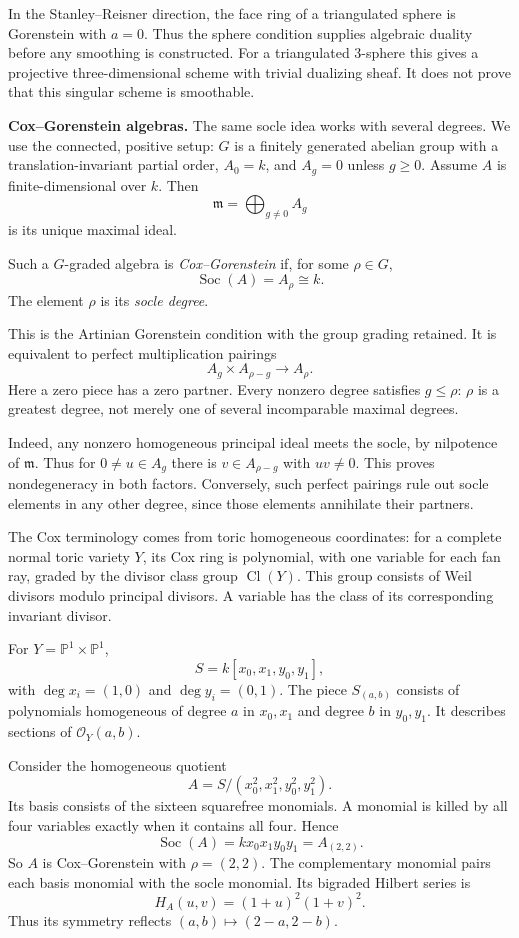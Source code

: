 In the Stanley--Reisner direction, the
face ring of a triangulated sphere is
Gorenstein with $a=0$. Thus the sphere
condition supplies algebraic duality before
any smoothing is constructed. For a
triangulated $3$-sphere this gives a
projective three-dimensional scheme with
trivial dualizing sheaf. It does not prove
that this singular scheme is smoothable.

\medskip\noindent
{\bf Cox--Gorenstein algebras.}
The same socle idea works with several
degrees. We use the connected, positive
setup: $G$ is a finitely generated abelian
group with a translation-invariant partial
order, $A_0=k$, and $A_g=0$ unless $g\geq0$.
Assume $A$ is finite-dimensional over $k$.
Then
$$
\mathfrak m=\bigoplus_{g\ne0}A_g
$$
is its unique maximal ideal.

\begin{definition}
\label{definition-cox-gorenstein}
Such a $G$-graded algebra is
{\it Cox--Gorenstein} if, for some
$\rho\in G$,
$$
\operatorname{Soc}(A)=A_\rho\cong k.
$$
The element $\rho$ is its
{\it socle degree}.
\end{definition}

This is the Artinian Gorenstein condition
with the group grading retained.
It is equivalent to perfect multiplication
pairings
$$
A_g\times A_{\rho-g}\longrightarrow A_\rho.
$$
Here a zero piece has a zero partner.
Every nonzero degree satisfies $g\leq\rho$:
$\rho$ is a greatest degree, not merely
one of several incomparable maximal degrees.

Indeed, any nonzero homogeneous principal
ideal meets the socle, by nilpotence of
$\mathfrak m$. Thus for $0\ne u\in A_g$
there is $v\in A_{\rho-g}$ with $uv\ne0$.
This proves nondegeneracy in both factors.
Conversely, such perfect pairings rule out
socle elements in any other degree, since
those elements annihilate their partners.

The Cox terminology comes from toric
homogeneous coordinates: for a complete
normal toric variety $Y$, its Cox ring is
polynomial, with one variable for each fan
ray, graded by the divisor class group
$\operatorname{Cl}(Y)$.
This group consists of Weil divisors modulo
principal divisors. A variable has the class
of its corresponding invariant divisor.

\begin{example}
\label{example-cox-bigraded}
For $Y=\mathbb P^1\times\mathbb P^1$,
$$
S=k[x_0,x_1,y_0,y_1],
$$
with $\deg x_i=(1,0)$ and
$\deg y_i=(0,1)$.
The piece $S_{(a,b)}$ consists of
polynomials homogeneous of degree $a$ in
$x_0,x_1$ and degree $b$ in $y_0,y_1$.
It describes sections of
$\mathcal O_Y(a,b)$.

Consider the homogeneous quotient
$$
A=S/(x_0^2,x_1^2,y_0^2,y_1^2).
$$
Its basis consists of the sixteen squarefree
monomials. A monomial is killed by all four
variables exactly when it contains all four.
Hence
$$
\operatorname{Soc}(A)
=kx_0x_1y_0y_1=A_{(2,2)}.
$$
So $A$ is Cox--Gorenstein with
$\rho=(2,2)$. The complementary monomial
pairs each basis monomial with the socle
monomial. Its bigraded Hilbert series is
$$
H_A(u,v)=(1+u)^2(1+v)^2.
$$
Thus its symmetry reflects
$(a,b)\mapsto(2-a,2-b)$.
\end{example}

